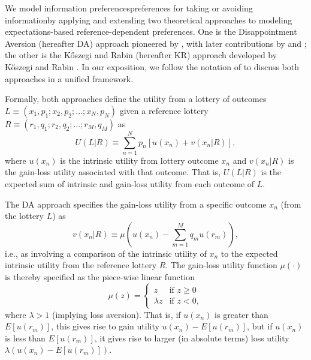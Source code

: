 We model information preferences\textemdash preferences for taking or avoiding information\textemdash by applying and extending two theoretical approaches to modeling expectations-based reference-dependent preferences. One is the Disappointment Aversion (hereafter DA) approach pioneered by \citet{bellDisappointmentDecisionMaking1985}, with later contributions by \citet{loomesDisappointmentDynamicConsistency1986} and \citet{gulTheoryDisappointmentAversion1991}; the other is the Kőszegi and Rabin (hereafter KR) approach developed by Kőszegi and Rabin \citep{koszegiModelReferenceDependentPreferences2006,koszegiReferenceDependentRiskAttitudes2007}. In our exposition, we follow the notation of \citet{odonoghueChapterReferenceDependentPreferences2018} to discuss both approaches in a unified framework.

Formally, both approaches define the utility from a lottery of outcomes $L \equiv (x_1,p_1;x_2,p_2;...;x_N,p_N)$ given a reference lottery $R \equiv (r_1,q_1;r_2,q_2;...;r_M,q_M)$ as
\begin{equation*}
  U(L|R) \equiv \sum_{n=1}^{N} p_n[u(x_n)+v(x_n|R)],
\end{equation*}
where $u(x_n)$ is the intrinsic utility from lottery outcome $x_n$ and $v(x_n|R)$ is the gain-loss utility associated with that outcome. That is, $U(L|R)$ is the expected sum of intrinsic and gain-loss utility from each outcome of $L$.

The DA approach specifies the gain-loss utility from a specific outcome $x_n$ (from the lottery $L$) as
\begin{equation*}
  v(x_n|R) \equiv \mu (u(x_n)-\sum_{m=1}^M q_mu(r_m)),
\end{equation*}
i.e., as involving a comparison of the intrinsic utility of $x_n$ to the expected intrinsic utility from the reference lottery $R$. The gain-loss utility function $\mu(\cdot)$ is thereby specified as the piece-wise linear function
\begin{equation*}
  \mu(z)=
  \begin{cases}
    z          & \text{if } z \geq 0 \\
    \lambda z  & \text{if } z < 0 ,
  \end{cases}
\end{equation*}
where $\lambda>1$ (implying loss aversion). That is, if $u(x_n)$ is greater than $E[u(r_m)]$, this gives rise to gain utility $u(x_n)-E[u(r_m)]$, but if $u(x_n)$ is less than $E[u(r_m)]$, it gives rise to larger (in absolute terms) loss utility $\lambda(u(x_n)-E[u(r_m)])$.

